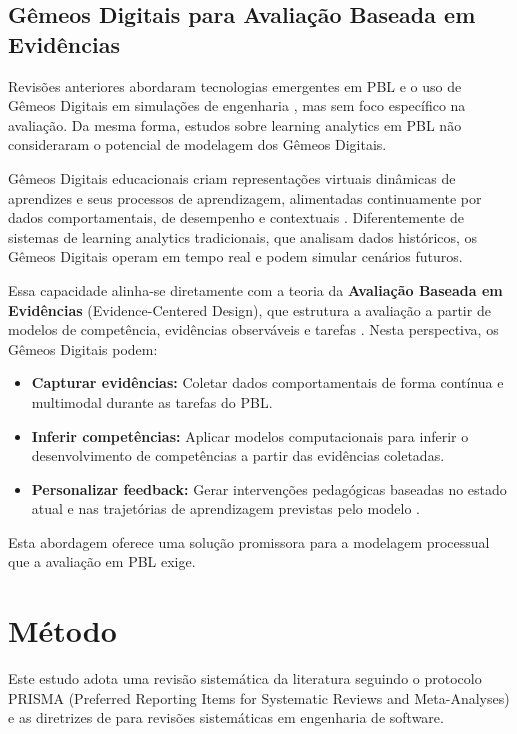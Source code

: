 \documentclass[english, spanish, brazilian]{RBIEarticle} %
\begin{document}
\subsection{Gêmeos Digitais para Avaliação Baseada em Evidências}

Revisões anteriores abordaram tecnologias emergentes em PBL \parencite{Chen2020} e o uso de Gêmeos Digitais em simulações de engenharia \parencite{Zhang2021}, mas sem foco específico na avaliação. Da mesma forma, estudos sobre learning analytics em PBL \parencite{Silva2022} não consideraram o potencial de modelagem dos Gêmeos Digitais.

Gêmeos Digitais educacionais criam representações virtuais dinâmicas de aprendizes e seus processos de aprendizagem, alimentadas continuamente por dados comportamentais, de desempenho e contextuais \parencite{Jones2020}. Diferentemente de sistemas de learning analytics tradicionais, que analisam dados históricos, os Gêmeos Digitais operam em tempo real e podem simular cenários futuros.

Essa capacidade alinha-se diretamente com a teoria da \textbf{Avaliação Baseada em Evidências} (Evidence-Centered Design), que estrutura a avaliação a partir de modelos de competência, evidências observáveis e tarefas \parencite{Mislevy2003}. Nesta perspectiva, os Gêmeos Digitais podem:
\begin{itemize}
    \item \textbf{Capturar evidências:} Coletar dados comportamentais de forma contínua e multimodal durante as tarefas do PBL.
    \item \textbf{Inferir competências:} Aplicar modelos computacionais para inferir o desenvolvimento de competências a partir das evidências coletadas.
    \item \textbf{Personalizar feedback:} Gerar intervenções pedagógicas baseadas no estado atual e nas trajetórias de aprendizagem previstas pelo modelo \parencite{Pellegrino2001}.
\end{itemize}
Esta abordagem oferece uma solução promissora para a modelagem processual que a avaliação em PBL exige.

\section{Método}

Este estudo adota uma revisão sistemática da literatura seguindo o protocolo PRISMA (Preferred Reporting Items for Systematic Reviews and Meta-Analyses) \parencite{Page2021} e as diretrizes de \textcite{Kitchenham2007} para revisões sistemáticas em engenharia de software.
\end{document}
